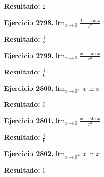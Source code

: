 \documentclass[10pt,a4paper]{article}
\begin{document}
\begin{solbox}
\textbf{Resultado:} \(\displaystyle 2\)
\end{solbox}

\begin{ejbox}
\textbf{Ejercicio 2798.}\quad $\lim_{x\to 0} \frac{1-\cos x}{x^2}$
\end{ejbox}

\begin{solbox}
\textbf{Resultado:} \(\displaystyle \frac{1}{2}\)
\end{solbox}

\newpage
\begin{ejbox}
\textbf{Ejercicio 2799.}\quad $\lim_{x\to 0} \frac{x-\sin x}{x^3}$
\end{ejbox}

\begin{solbox}
\textbf{Resultado:} \(\displaystyle \frac{1}{6}\)
\end{solbox}

\begin{ejbox}
\textbf{Ejercicio 2800.}\quad $\lim_{x\to 0^+} x\ln x$
\end{ejbox}

\begin{solbox}
\textbf{Resultado:} \(\displaystyle 0\)
\end{solbox}

\begin{ejbox}
\textbf{Ejercicio 2801.}\quad $\lim_{x\to 0} \frac{x-\sin x}{x^3}$
\end{ejbox}

\begin{solbox}
\textbf{Resultado:} \(\displaystyle \frac{1}{6}\)
\end{solbox}

\newpage
\begin{ejbox}
\textbf{Ejercicio 2802.}\quad $\lim_{x\to 0^+} x\ln x$
\end{ejbox}

\begin{solbox}
\textbf{Resultado:} \(\displaystyle 0\)
\end{solbox}

\newpage
\end{document}
